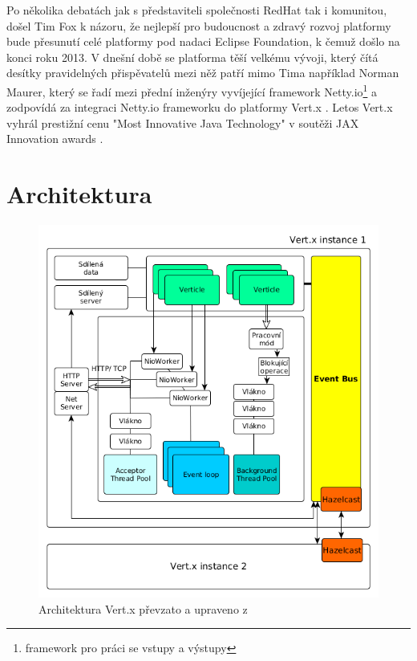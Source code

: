 Po několika debatách jak s představiteli společnosti RedHat tak i komunitou, došel Tim Fox k názoru, že nejlepší pro budoucnost a zdravý rozvoj platformy bude přesunutí celé platformy pod nadaci Eclipse Foundation, k čemuž došlo na konci roku 2013. V dnešní době se platforma těší velkému vývoji, který čítá desítky  pravidelných přispěvatelů mezi něž patří mimo Tima například Norman Maurer, který se řadí mezi přední inženýry vyvíjející framework Netty.io\footnote{framework pro práci se vstupy a výstupy} a zodpovídá za integraci Netty.io frameworku do platformy Vert.x \cite{vertxNodejs}.
Letos Vert.x vyhrál prestižní cenu "Most Innovative Java Technology" v soutěži JAX Innovation awards \citep{JAX}.

\section{Architektura}

\begin{figure}[h]
\begin{centering}
\includegraphics[scale=0.55]{obrazky/architecture_vertx}
\par\end{centering}
\caption{Architektura Vert.x převzato a upraveno z \cite{vertxArchitectureDiagram} \label{fig:vertxArchitectureDiagram}}
\end{figure}

